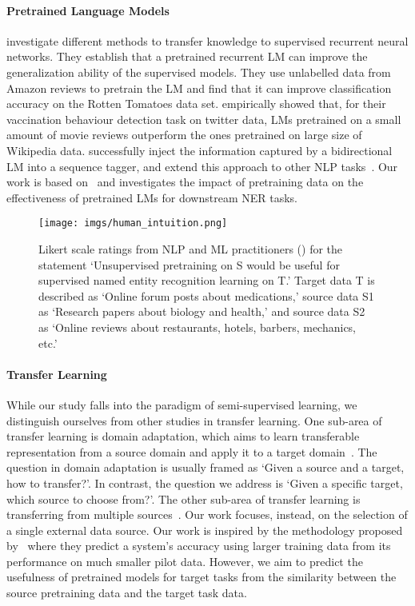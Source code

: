 \documentclass[11pt,a4paper]{article}
\begin{document}
\paragraph{Pretrained Language Models}
\citet{Dai:Le:NIPS:2015} investigate different methods to transfer knowledge to supervised recurrent neural networks. 
They establish that a pretrained recurrent LM can improve the generalization ability of the supervised models. 
They use unlabelled data from Amazon reviews to pretrain the LM and find that it can improve classification accuracy on the Rotten Tomatoes data set.
\citet{Joshi:Dai:SMM4H:2018} empirically showed that, for their vaccination behaviour detection task on twitter data, LMs pretrained on a small amount of movie reviews outperform the ones pretrained on large size of Wikipedia data.
\citet{Peters:Ammar:ACL:2017} successfully inject the information captured by a bidirectional LM into a sequence tagger, and extend this approach to other NLP tasks~\citep{Peters:Neumann:NAACL:2018}. 
Our work is based on~\citep{Peters:Neumann:NAACL:2018} and investigates the impact of pretraining data on the effectiveness of pretrained LMs for downstream NER tasks.


\begin{figure*}[ht]
    \centering
    \texttt{[image: imgs/human\_intuition.png]}
    \caption{Likert scale ratings from NLP and ML practitioners () for the statement `Unsupervised pretraining on S would be useful for supervised named entity recognition learning on T.' Target data T is described as `Online forum posts about medications,' source data S1 as `Research papers about biology and health,' and source data S2 as `Online reviews about restaurants, hotels, barbers, mechanics, etc.'~\label{fig:human-intuition}}
\end{figure*}

\paragraph{Transfer Learning}
While our study falls into the paradigm of semi-supervised learning, we distinguish ourselves from other studies in transfer learning. 
One sub-area of transfer learning is domain adaptation, which aims to learn transferable representation from a source domain and apply it to a target domain~\citep{Blitzer:McDonald:EMNLP:2006,Yang:Eisenstein:NAACL:2015}. 
The question in domain adaptation is usually framed as `Given a source and a target, how to transfer?'. 
In contrast, the question we address is `Given a specific target, which source to choose from?'. 
The other sub-area of transfer learning is transferring from multiple sources~\citep{Yin:Schutze:CoNLL:2015,Li:Baldwin:NAACL:2018}. 
Our work focuses, instead, on the selection of a single external data source. 
Our work is inspired by the methodology proposed by~\citet{Johnson:Anderson:ACL:2018} where they predict a system's accuracy using larger training data from its performance on much smaller pilot data. 
However, we aim to predict the usefulness of pretrained models for target tasks from the similarity between the source pretraining data and the target task data.
\end{document}
